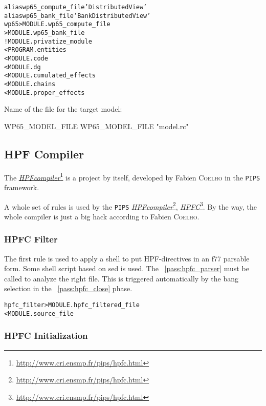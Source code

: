 \documentclass[a4paper]{report}
\newenvironment{PipsMake}{\begin{alltt}}{\end{alltt}}
\newcommand{\PipsPassRef}[1]{\texttt{\detokenize{#1}}~\ref{pass:#1}}
\newenvironment{PipsPass}[1]{\label{pass:#1}}{}
\newcommand{\LINK}[2]{\href{#2}{#1}\footnote{\url{#2}}\xspace}
\newcommand{\HPFC}{\LINK{\emph{HPFC}}{http://www.cri.ensmp.fr/pips/hpfc.html}}
\newcommand{\HPFcompiler}{\LINK{\emph{HPF\space{}compiler}}{http://www.cri.ensmp.fr/pips/hpfc.html}}
\newcommand{\Pips}{\texttt{PIPS}}
\begin{document}
\begin{PipsMake}
alias wp65_compute_file 'Distributed View'
alias wp65_bank_file 'Bank Distributed View'
wp65                            > MODULE.wp65_compute_file
                                > MODULE.wp65_bank_file
        ! MODULE.privatize_module
        < PROGRAM.entities
        < MODULE.code
        < MODULE.dg
        < MODULE.cumulated_effects
        < MODULE.chains
        < MODULE.proper_effects

\end{PipsMake}

Name of the file for the target model:
\begin{PipsProp}{WP65_MODEL_FILE}
WP65_MODEL_FILE "model.rc"
\end{PipsProp}

\subsection{HPF Compiler}
\label{subsubsection-hpf-compiler}

The \HPFcompiler{} is a project by itself, developed by Fabien
\textsc{Coelho} in the \Pips{} framework.

A whole set of rules is used by the \Pips{} \HPFcompiler{}, \HPFC{}.  By
the way, the whole compiler is just a big hack according to Fabien
\textsc{Coelho}.

\subsubsection{HPFC Filter}

The first rule is used to apply a shell to put HPF-directives in an f77 parsable form.
Some shell script based on sed is used. The \PipsPassRef{hpfc_parser} must be
called to analyze the right file. This is triggered automatically by the
bang selection in the \PipsPassRef{hpfc_close} phase.
\begin{PipsPass}{hpfc_filter}
\end{PipsPass}

\begin{PipsMake}
hpfc_filter             > MODULE.hpfc_filtered_file
    < MODULE.source_file
\end{PipsMake}

\subsubsection{HPFC Initialization}
\end{document}
